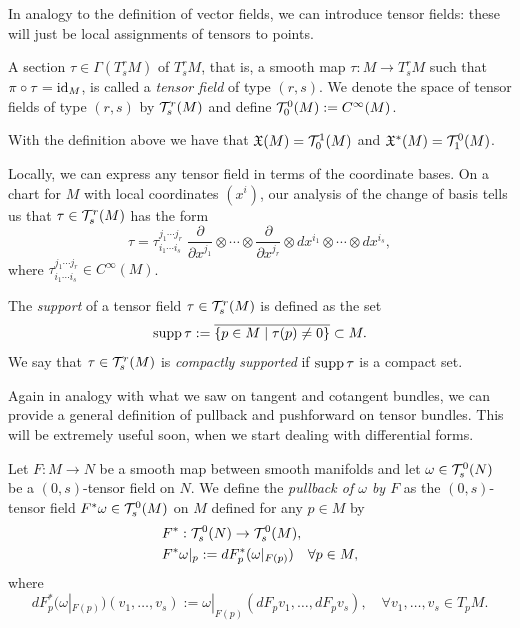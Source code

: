 In analogy to the definition of vector fields, we can introduce tensor fields: these will just be local assignments of tensors to points.

\begin{definition}
	A section $\tau\in\Gamma(T_s^r M)$ of $T_s^r M$, that is, a smooth map $\tau : M \to T_s^r M$ such that $\pi\circ \tau = \operatorname{id}_M$, is called a \emph{tensor field} of type $(r,s)$.
	We denote the space of tensor fields of type $(r,s)$ by $\mathcal{T}_s^r(M)$ and define $\mathcal{T}_0^0(M) := C^\infty(M)$.
\end{definition}

\begin{example}
	With the definition above we have that $\mathfrak{X}(M) = \mathcal{T}_0^1(M)$ and $\mathfrak{X}^*(M) = \mathcal{T}_1^0(M)$.
\end{example}

Locally, we can express any tensor field in terms of the coordinate bases.
On a chart for $M$ with local coordinates $(x^i)$, our analysis of the change of basis tells us that $\tau\in\mathcal{T}_s^r(M)$ has the form
\begin{equation}
	\tau = \tau^{j_1\cdots j_r}_{i_1\cdots i_s}\; \frac{\partial}{\partial x^{j_1}}\otimes\cdots\otimes\frac{\partial}{\partial x^{j_r}}\otimes dx^{i_1}\otimes\cdots\otimes dx^{i_s},
\end{equation}
where $\tau^{j_1\cdots j_r}_{i_1\cdots i_s}\in C^\infty(M)$.

\begin{definition}
	The \emph{support} of a tensor field $\tau\in\mathcal{T}_s^r(M)$ is defined as the set
	\begin{equation}
		\operatorname{supp} \tau := \overline{\{p\in M\mid \tau(p) \neq 0\}} \subset M.
	\end{equation}
	We say that $\tau\in\mathcal{T}_s^r(M)$ is \emph{compactly supported} if $\operatorname{supp}\tau$ is a compact set.
\end{definition}

Again in analogy with what we saw on tangent and cotangent bundles, we can provide a general definition of pullback and pushforward on tensor bundles.
This will be extremely useful soon, when we start dealing with differential forms.

\begin{definition}\label{def:pullback0s}
	Let $F:M\to N$ be a smooth map between smooth manifolds and let $\omega \in \mathcal{T}_s^0(N)$ be a $(0,s)$-tensor field on $N$. We define the \emph{pullback of $\omega$ by $F$} as the $(0,s)$-tensor field $F^*\omega \in \mathcal{T}_s^0(M)$ on $M$ defined for any $p\in M$ by
	\begin{align}
		 & F^* : \mathcal{T}_s^0(N) \to \mathcal{T}_s^0(M),                             \\
		 & F^*\omega|_p := dF^*_p(\omega|_{F(p)}) \quad \forall p\in M,
	\end{align}
	where
	\begin{equation}
		dF^*_p(\omega|_{F(p)})(v_1, \ldots, v_s) := \omega|_{F(p)} (dF_p v_1, \ldots, dF_p v_s), \quad\forall v_1, \ldots, v_s \in T_p M.
	\end{equation}
\end{definition}

